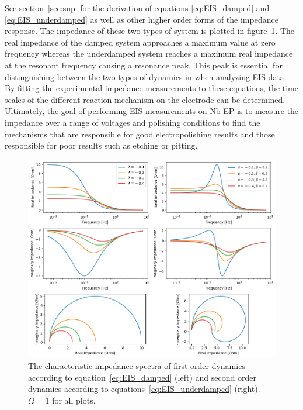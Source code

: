 See section~\ref{sec:sup} for the derivation of equations \ref{eq:EIS_damped} and \ref{eq:EIS_underdamped} as well as other higher order forms of the impedance response. The impedance of these two types of system is plotted in figure~\ref{fig:EIS_plots}. The real impedance of the damped system approaches a maximum value at zero frequency whereas the underdamped system reaches a maximum real impedance at the resonant frequency causing a resonance peak. This peak is essential for distinguishing between the two types of dynamics in when analyzing EIS data. By fitting the experimental impedance measurements to these equations, the time scales of the different reaction mechanism on the electrode can be determined. Ultimately, the goal of performing EIS measurements on Nb EP is to measure the impedance over a range of voltages and polishing conditions to find the mechanisms that are responsible for good electropolishing results and those responsible for poor results such as etching or pitting.


\begin{figure}[htbp]
    \centering
    
    \includegraphics[width=\textwidth]{./figures/EIS_plots.png}
    \caption{The characteristic impedance spectra of first order dynamics according to equation~\ref{eq:EIS_damped} (left) and second order dynamics according to equations~\ref{eq:EIS_underdamped} (right). $\Omega = 1$ for all plots.}
    \label{fig:EIS_plots}
\end{figure}




